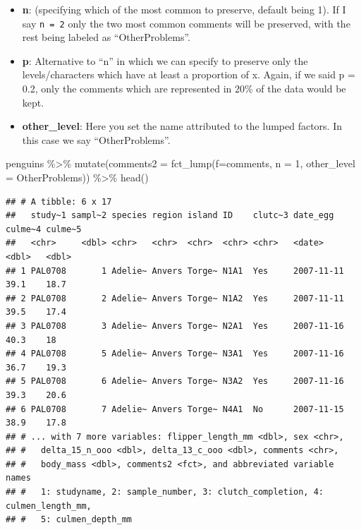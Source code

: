 \documentclass[
]{book}
\newenvironment{Shaded}{\begin{snugshade}}{\end{snugshade}}
\newcommand{\AttributeTok}[1]{\textcolor[rgb]{0.77,0.63,0.00}{#1}}
\newcommand{\DecValTok}[1]{\textcolor[rgb]{0.00,0.00,0.81}{#1}}
\newcommand{\FunctionTok}[1]{\textcolor[rgb]{0.00,0.00,0.00}{#1}}
\newcommand{\NormalTok}[1]{#1}
\newcommand{\SpecialCharTok}[1]{\textcolor[rgb]{0.00,0.00,0.00}{#1}}
\newcommand{\StringTok}[1]{\textcolor[rgb]{0.31,0.60,0.02}{#1}}
\begin{document}
\begin{itemize}
\item
  \textbf{n}: (specifying which of the most common to preserve, default being 1).
  If I say \texttt{n\ =\ 2} only the two most common comments will be preserved, with the rest being labeled as ``OtherProblems''.
\item
  \textbf{p}: Alternative to ``n'' in which we can specify to preserve only the levels/characters which have at least a proportion of x.
  Again, if we said p = 0.2, only the comments which are represented in 20\% of the data would be kept.
\item
  \textbf{other\_level}: Here you set the name attributed to the lumped factors.
  In this case we say ``OtherProblems''.
\end{itemize}

\begin{Shaded}
\begin{Highlighting}[]
\NormalTok{penguins }\SpecialCharTok{\%\textgreater{}\%} 
  \FunctionTok{mutate}\NormalTok{(}\AttributeTok{comments2 =} \FunctionTok{fct\_lump}\NormalTok{(}\AttributeTok{f=}\NormalTok{comments, }\AttributeTok{n =} \DecValTok{1}\NormalTok{, }\AttributeTok{other\_level =} \StringTok{\textquotesingle{}OtherProblems\textquotesingle{}}\NormalTok{)) }\SpecialCharTok{\%\textgreater{}\%} 
  \FunctionTok{head}\NormalTok{()}
\end{Highlighting}
\end{Shaded}

\begin{verbatim}
## # A tibble: 6 x 17
##   study~1 sampl~2 species region island ID    clutc~3 date_egg   culme~4 culme~5
##   <chr>     <dbl> <chr>   <chr>  <chr>  <chr> <chr>   <date>       <dbl>   <dbl>
## 1 PAL0708       1 Adelie~ Anvers Torge~ N1A1  Yes     2007-11-11    39.1    18.7
## 2 PAL0708       2 Adelie~ Anvers Torge~ N1A2  Yes     2007-11-11    39.5    17.4
## 3 PAL0708       3 Adelie~ Anvers Torge~ N2A1  Yes     2007-11-16    40.3    18  
## 4 PAL0708       5 Adelie~ Anvers Torge~ N3A1  Yes     2007-11-16    36.7    19.3
## 5 PAL0708       6 Adelie~ Anvers Torge~ N3A2  Yes     2007-11-16    39.3    20.6
## 6 PAL0708       7 Adelie~ Anvers Torge~ N4A1  No      2007-11-15    38.9    17.8
## # ... with 7 more variables: flipper_length_mm <dbl>, sex <chr>,
## #   delta_15_n_ooo <dbl>, delta_13_c_ooo <dbl>, comments <chr>,
## #   body_mass <dbl>, comments2 <fct>, and abbreviated variable names
## #   1: studyname, 2: sample_number, 3: clutch_completion, 4: culmen_length_mm,
## #   5: culmen_depth_mm
\end{verbatim}
\end{document}
